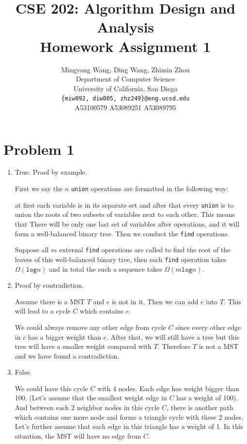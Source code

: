 \documentclass{article} %
\title{CSE 202: Algorithm Design and Analysis \\ Homework Assignment 1}
\author{
  Mingyang Wang, Ding Wang, Zhimin Zhou\\
  Department of Computer Science\\
  University of California, San Diego\\
  \texttt{\{miw092, diw005, zhz249\}@eng.ucsd.edu}\\
  A53100579 A53089251 A53089795\\
}
\begin{document}
\maketitle
\section*{Problem 1}

\begin{enumerate}
\item
	
    True. Proof by example.
    
    First we say the $n$ \texttt{union} operations are formatted in the following way:
    
    at first each variable is in its separate set and after that every \texttt{union} is to union the roots of two subsets of variables next to each other. This means that There will be only one last set of variables after operations, and it will form a well-balanced binary tree. Then we conduct the \texttt{find} operations.
    
    Suppose all $m$ external \texttt{find} operations are called to find the root of the leaves of this well-balanced binary tree, then each \texttt{find} operation takes $\Omega(\mathtt{log}n)$ and in total the such a sequence takes $\Omega(m\mathtt{log}n)$.

\item
	
    Proof by contradiction. 
  
	Assume there is a MST $T$ and $e$ is not in it. Then we can add $e$ into $T$. This will lead to a cycle $C$ which contains $e$.

	We could always remove any other edge from cycle $C$ since every other edge in $c$ has a bigger weight than $e$. After that, we will still have a tree but this tree will have a smaller weight compared with $T$. Therefore $T$ is not a MST and we have found a contradiction.

\item

  	False. 
  
	We could have this cycle $C$ with 4 nodes. Each edge has weight bigger than 100. (Let's assume that the smallest weight edge in $C$ has a weight of 100). And between each 2 neighbor nodes in this cycle $C$, there is another path which contains one more node and forms a triangle cycle with these 2 nodes. Let's further assume that each edge in this triangle has a weight of 1. In this situation, the MST will have no edge from $C$.
    

\end{enumerate}
\end{document}
